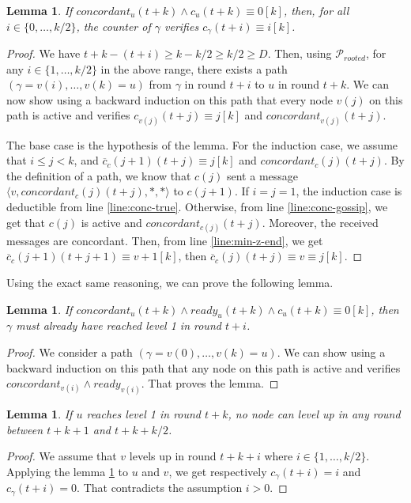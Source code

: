 \documentclass[11pt,letterpaper]{article}
\renewcommand{\leq}{\leqslant}
\renewcommand{\geq}{\geqslant}
\newtheorem{lem}[thm]{Lemma}
\newcommand{\cent}{\gamma}
\begin{document}
\begin{lem} \label{lem:conc-safety}
	If $concordant_u(t+k) \wedge c_u(t+k) \equiv 0 [k]$, then, for all $i \in \{0, \dots, k/2\}$, the counter of $\cent$ verifies $c_\cent(t+i) \equiv i [k]$.
\end{lem}
\begin{proof}
	We have $t+k - (t+i) \geq k - k/2 \geq k/2 \geq D$.
	Then, using $\mathcal{P}_{rooted}$, for any $i \in \{1, \dots, k/2\}$ in the above range, there exists a path $(\cent = v(i), \dots, v(k) = u)$ from $\cent$ in round $t+i$ to $u$ in round $t+k$. 
	We can now show using a backward induction on this path that every node $v(j)$ on this path is active and verifies $c_{v(j)}(t+j) \equiv j [k]$ and $concordant_{v(j)}(t+j)$.

	The base case is the hypothesis of the lemma.
	For the induction case, we assume that $i \leq j < k$, and $\overline{c}_c(j+1)(t+j) \equiv j [k]$ and $concordant_c(j)(t+j)$.
	By the definition of a path, we know that $c(j)$ sent a message $\langle v, concordant_c(j)(t+j), *, * \rangle$ to $c(j+1)$.
	If $i = j = 1$, the induction case is deductible from line \ref{line:conc-true}.
	Otherwise, from line \ref{line:conc-gossip}, we get that $c(j)$ is active and $concordant_{c(j)}(t+j)$. Moreover, the received messages are concordant.
	Then, from line \ref{line:min-z-end}, we get $\overline{c}_c(j+1)(t+j+1) \equiv v+1 [k]$, then $\overline{c}_c(j)(t+j) \equiv v \equiv j [k]$.
\end{proof}

\noindent Using the exact same reasoning, we can prove the following lemma.
\begin{lem} \label{lem:conc-safety-bis}
	If $concordant_u(t+k) \wedge ready_u(t+k) \wedge c_u(t+k) \equiv 0 [k]$, then $\cent$ must already have reached level 1 in round $t+i$.
\end{lem}
\begin{proof}
	We consider a path $(\cent = v(0), \dots, v(k) = u)$.
	We can show using a backward induction on this path that any node on this path is active and verifies $concordant_{v(i)} \wedge ready_{v(i)}$.
	That proves the lemma.
\end{proof}

\begin{lem} \label{lem:no-close-level2}
	If $u$ reaches level 1 in round $t+k$, no node can level up in any round between $t+k+1$ and $t+k+k/2$.
\end{lem}
\begin{proof}
	We assume that $v$ levels up in round $t+k+i$ where $i \in \{1, \dots, k/2\}$.
	Applying the lemma \ref{lem:conc-safety} to $u$ and $v$, we get respectively $c_\cent(t+i) = i$ and $c_\cent(t+i) = 0$.
	That contradicts the assumption $i > 0$.
\end{proof}
\end{document}
